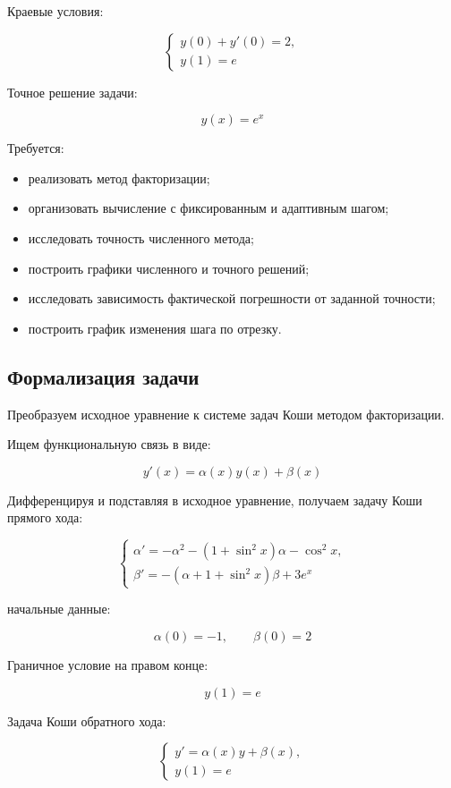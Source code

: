 \documentclass[14pt]{extarticle}
\begin{document}
	Краевые условия:
	
	\[
	\begin{cases}
		y(0) + y'(0) = 2, \\
		y(1) = e
	\end{cases}
	\]
	
	Точное решение задачи:
	
	\[
	y(x) = e^x
	\]
	
	Требуется:
	
	\begin{itemize}
		\item реализовать метод факторизации;
		\item организовать вычисление с фиксированным и адаптивным шагом;
		\item исследовать точность численного метода;
		\item построить графики численного и точного решений;
		\item исследовать зависимость фактической погрешности от заданной точности;
		\item построить график изменения шага по отрезку.
	\end{itemize}
	
	\subsection{Формализация задачи}
	
	Преобразуем исходное уравнение к системе задач Коши методом факторизации.
	
	Ищем функциональную связь в виде:
	
	\[
	y'(x) = \alpha(x) y(x) + \beta(x)
	\]
	
	Дифференцируя и подставляя в исходное уравнение, получаем задачу Коши прямого хода:
	
	\[
	\begin{cases}
		\alpha' = -\alpha^2 - (1 + \sin^2 x)\alpha - \cos^2 x, \\
		\beta' = -(\alpha + 1 + \sin^2 x)\beta + 3e^x
	\end{cases}
	\]
	
	начальные данные:
	
	\[
	\alpha(0) = -1, \qquad \beta(0) = 2
	\]
	
	Граничное условие на правом конце:
	
	\[
	y(1) = e
	\]
	
	Задача Коши обратного хода:
	
	\[
	\begin{cases}
		y' = \alpha(x) y + \beta(x), \\
		y(1) = e
	\end{cases}
	\]
	
\end{document}
